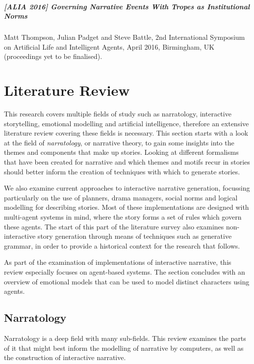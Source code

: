 \documentclass[11pt]{report}
\begin{document}
  \paragraph{[ALIA 2016] Governing Narrative Events With Tropes as Institutional
    Norms} Matt Thompson, Julian Padget and Steve Battle, 2nd International
  Symposium on Artificial Life and Intelligent Agents, April 2016, Birmingham,
  UK (proceedings yet to be finalised).\label{pub:alia}




\chapter{Literature Review}
\label{cha:literature-review}


This research covers multiple fields of study such as narratology, interactive
storytelling, emotional modelling and artificial intelligence, therefore an extensive
literature review covering these fields is necessary. This section starts with a
look at the field of \emph{narratology}, or narrative theory, to gain some
insights into the themes and components that make up stories. Looking at
different formalisms that have been created for narrative and which themes and
motifs recur in stories should better inform the creation of techniques with
which to generate stories.

We also examine current approaches to interactive narrative generation,
focussing particularly on the use of planners, drama managers, social norms and
logical modelling for describing stories. Most of these implementations are
designed with multi-agent systems in mind, where the story forms a set of rules
which govern these agents. The start of this part of the literature survey also
examines non-interactive story generation through means of techniques such as
generative grammar, in order to provide a historical context for the research
that follows. 

As part of the examination of implementations of interactive narrative, this review especially focuses on agent-based systems. The section concludes with an overview of emotional models that can be used to model distinct characters using agents.

\section{Narratology}
\label{sec:narratology}
Narratology is a deep field with many sub-fields. This review examines the parts of it that might best inform the modelling of narrative by computers, as well as the construction of interactive narrative.
\end{document}
